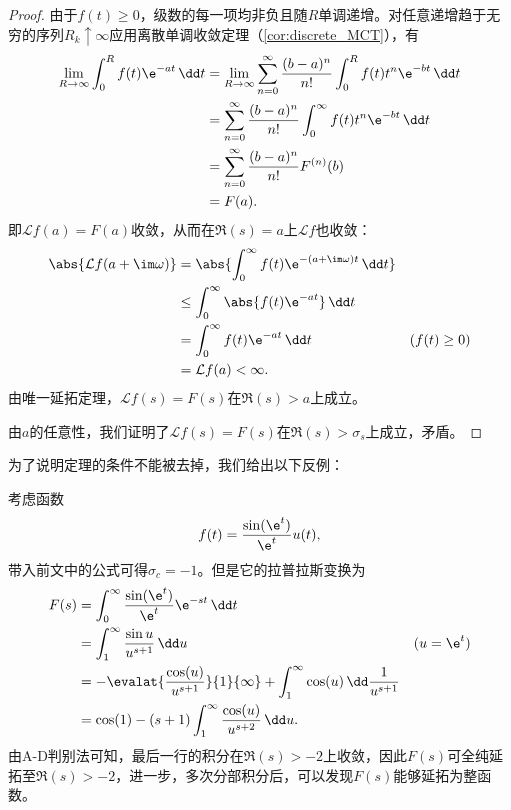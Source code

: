 \begin{proof}
    由于$f(t)\geq 0$，级数的每一项均非负且随$R$单调递增。对任意递增趋于无穷的序列$R_k\uparrow\infty$应用离散单调收敛定理（\cref{cor:discrete_MCT}），有
    \begin{align}
        \lim_{R\to\infty}\int_{0}^{R}f(t)\e^{-at}\,\dd t&=\lim_{R\to\infty}\sum_{n=0}^{\infty}\frac{(b-a)^n}{n!}\int_{0}^{R}f(t)t^n\e^{-bt}\,\dd t\nonumber\\
        &=\sum_{n=0}^{\infty}\frac{(b-a)^n}{n!}\int_{0}^{\infty}f(t)t^n\e^{-bt}\,\dd t\nonumber\\
        &=\sum_{n=0}^{\infty}\frac{(b-a)^n}{n!}F^{(n)}(b)\nonumber\\
        &=F(a).
    \end{align}
    即$\mathcal{L}f(a)=F(a)$收敛，从而在$\Re(s)=a$上$\mathcal{L}f$也收敛：
    \begin{align}
        \abs{\mathcal{L}f(a+\im\omega)}&=\abs{\int_{0}^{\infty}f(t)\e^{-(a+\im\omega)t}\,\dd t}\nonumber\\
        &\leq\int_{0}^{\infty}\abs{f(t)\e^{-at}}\,\dd t\nonumber\\
        &=\int_{0}^{\infty}f(t)\e^{-at}\,\dd t&(f(t)\geq 0)\nonumber\\
        &=\mathcal{L}f(a)<\infty.
    \end{align}
    由唯一延拓定理，$\mathcal{L}f(s)=F(s)$在$\Re(s)>a$上成立。

    由$a$的任意性，我们证明了$\mathcal{L}f(s)=F(s)$在$\Re(s)>\sigma_s$上成立，矛盾。
\end{proof}

为了说明定理的条件不能被去掉，我们给出以下反例\cite{Laplace_Transform}：
\begin{example}
    考虑函数
    \begin{equation}
        f(t)=\frac{\sin(\e^t)}{\e^t}u(t),
    \end{equation}
    带入前文中的公式可得$\sigma_c=-1$。但是它的拉普拉斯变换为
    \begin{align}
        F(s)&=\int_{0}^{\infty}\frac{\sin(\e^t)}{\e^t}\e^{-st}\,\dd t\nonumber\\
        &=\int_{1}^{\infty}\frac{\sin u}{u^{s+1}}\,\dd u&(u=\e^t)\nonumber\\
        &=-\evalat{\frac{\cos(u)}{u^{s+1}}}{1}{\infty}+\int_{1}^{\infty}\cos(u)\,\dd\frac{1}{u^{s+1}}\nonumber\\
        &=\cos(1)-(s+1)\int_{1}^{\infty}\frac{\cos(u)}{u^{s+2}}\,\dd u.
    \end{align}
    由A-D判别法可知，最后一行的积分在$\Re(s)>-2$上收敛，因此$F(s)$可全纯延拓至$\Re(s)>-2$，进一步，多次分部积分后，可以发现$F(s)$能够延拓为整函数。
\end{example}

